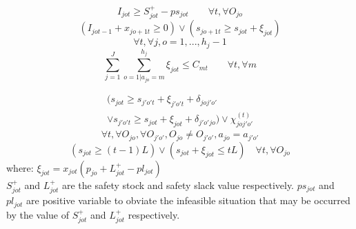 \documentclass[letterpaper]{article} %
\begin{document}
\begin{equation}
I_{jot}\geq S_{jot}^{+} - ps_{jot} \quad\quad  \forall t, \forall O_{jo}
\end{equation}
\begin{equation}
(I_{j o t-1}+x_{j o+1 t} \geq 0) \vee  (s_{j o+1 t} \geq s_{jot}+\xi_{jot})
\end{equation}
$$\forall t, \forall j,o=1,...,h_{j}-1$$
\begin{equation}
\sum_{j=1}^{J} \sum_{o=1|a_{jo}=m}^{h_{j}} \xi_{j o t} \leq C_{mt}  \quad\quad  \forall t, \forall m
\end{equation}

\begin{multline}
\Big( s_{jot} \geq s_{j'o't} + \xi_{j'o't}+ \delta_{joj'o'} 
\\
\vee s_{j'o't}\geq s_{jot} + \xi_{jot}+ \delta_{j'o'jo} \Big)\vee\chi_{joj'o'}^{(t)}  
\end{multline}
$$\forall t, \forall O_{jo}, \forall O_{j'o'},
O_{jo}\neq O_{j'o'},a_{jo}=a_{j'o'}$$
\begin{equation}
(s_{jot} \geq (t-1)L) \vee  (s_{jot}+\xi_{jot} \leq tL) \quad  \forall t, \forall O_{jo}
\end{equation}
where: $\xi_{jot}=x_{jot}(p_{jo}+L_{jot}^{+}-pl_{jot})$
\\
$S_{jot}^{+}$ and $L_{jot}^{+}$ are the safety stock and safety slack value respectively. $ps_{jot}$ and $pl_{jot}$ are positive variable to obviate the infeasible situation that may be occurred by the value of $S_{jot}^{+}$ and $L_{jot}^{+}$ respectively.  
\end{document}
